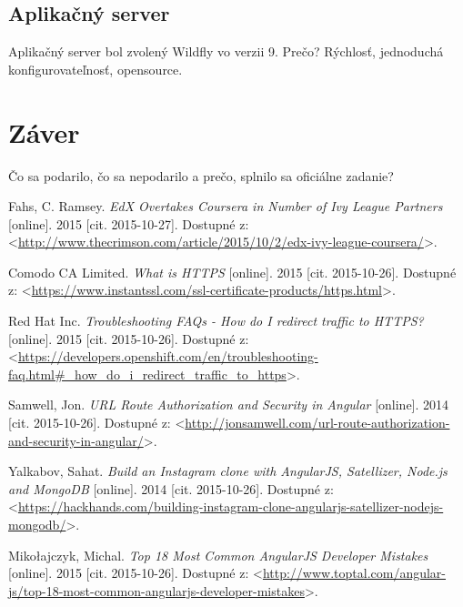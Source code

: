\documentclass[12pt,oneside]{fithesis2}
\begin{document}
      \section{Aplikačný server}
      \par Aplikačný server bol zvolený Wildfly vo verzii 9. Prečo? Rýchlosť, jednoduchá konfigurovateľnosť, opensource.
    \chapter{Záver}   
       \par Čo sa podarilo, čo sa nepodarilo a prečo, splnilo sa oficiálne zadanie?
       
    \begin{thebibliography}{59}
    
  		Fahs, C. Ramsey.
  		\emph{EdX Overtakes Coursera in Number of Ivy League Partners}
  		[online].
  		2015
  		[cit. 2015-10-27].
  		Dostupné z: <\url{http://www.thecrimson.com/article/2015/10/2/edx-ivy-league-coursera/}>.

  		Comodo CA Limited.
  		\emph{What is HTTPS}
  		[online].
  		2015
  		[cit. 2015-10-26].
  		Dostupné z: <\url{https://www.instantssl.com/ssl-certificate-products/https.html}>.
	
  		Red Hat Inc.
  		\emph{Troubleshooting FAQs - How do I redirect traffic to HTTPS?}
  		[online].
  		2015
  		[cit. 2015-10-26].
  		Dostupné z: <\url{https://developers.openshift.com/en/troubleshooting-faq.html#_how_do_i_redirect_traffic_to_https}>.
  		
  		Samwell, Jon.
  		\emph{URL Route Authorization and Security in Angular}
  		[online].
  		2014
  		[cit. 2015-10-26].
  		Dostupné z: <\url{http://jonsamwell.com/url-route-authorization-and-security-in-angular/}>.
  		
  		Yalkabov, Sahat.
  		\emph{Build an Instagram clone with AngularJS, Satellizer, Node.js and MongoDB}
  		[online].
  		2014
  		[cit. 2015-10-26].
  		Dostupné z: <\url{https://hackhands.com/building-instagram-clone-angularjs-satellizer-nodejs-mongodb/}>.
  		
  		Mikołajczyk, Michal.
  		\emph{Top 18 Most Common AngularJS Developer Mistakes}
  		[online].
  		2015
  		[cit. 2015-10-26].
  		Dostupné z: <\url{http://www.toptal.com/angular-js/top-18-most-common-angularjs-developer-mistakes}>.
  			

\end{thebibliography}
\end{document}
